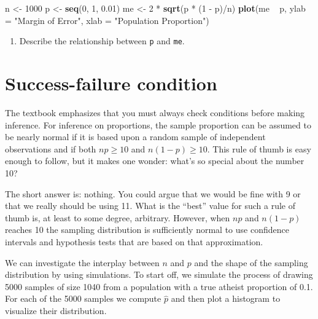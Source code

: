 \documentclass[]{book}
\newenvironment{Shaded}{\begin{snugshade}}{\end{snugshade}}
\newcommand{\KeywordTok}[1]{\textcolor[rgb]{0.13,0.29,0.53}{\textbf{{#1}}}}
\newcommand{\DataTypeTok}[1]{\textcolor[rgb]{0.13,0.29,0.53}{{#1}}}
\newcommand{\DecValTok}[1]{\textcolor[rgb]{0.00,0.00,0.81}{{#1}}}
\newcommand{\FloatTok}[1]{\textcolor[rgb]{0.00,0.00,0.81}{{#1}}}
\newcommand{\StringTok}[1]{\textcolor[rgb]{0.31,0.60,0.02}{{#1}}}
\newcommand{\NormalTok}[1]{{#1}}
\providecommand{\tightlist}{%
  \setlength{\itemsep}{0pt}\setlength{\parskip}{0pt}}
\theoremstyle{definition}
\theoremstyle{definition}
\theoremstyle{definition}
\theoremstyle{remark}
\begin{document}
\begin{Shaded}
\begin{Highlighting}[]
\NormalTok{n <-}\StringTok{ }\DecValTok{1000}
\NormalTok{p <-}\StringTok{ }\KeywordTok{seq}\NormalTok{(}\DecValTok{0}\NormalTok{, }\DecValTok{1}\NormalTok{, }\FloatTok{0.01}\NormalTok{)}
\NormalTok{me <-}\StringTok{ }\DecValTok{2} \NormalTok{*}\StringTok{ }\KeywordTok{sqrt}\NormalTok{(p *}\StringTok{ }\NormalTok{(}\DecValTok{1} \NormalTok{-}\StringTok{ }\NormalTok{p)/n)}
\KeywordTok{plot}\NormalTok{(me ~}\StringTok{ }\NormalTok{p, }\DataTypeTok{ylab =} \StringTok{"Margin of Error"}\NormalTok{, }\DataTypeTok{xlab =} \StringTok{"Population Proportion"}\NormalTok{)}
\end{Highlighting}
\end{Shaded}

\begin{enumerate}
\def\labelenumi{\arabic{enumi}.}
\setcounter{enumi}{7}
\tightlist
\item
  Describe the relationship between \texttt{p} and \texttt{me}.
\end{enumerate}

\section{Success-failure condition}\label{success-failure-condition}

The textbook emphasizes that you must always check conditions before
making inference. For inference on proportions, the sample proportion
can be assumed to be nearly normal if it is based upon a random sample
of independent observations and if both \(np \geq 10\) and
\(n(1 - p) \geq 10\). This rule of thumb is easy enough to follow, but
it makes one wonder: what's so special about the number 10?

The short answer is: nothing. You could argue that we would be fine with
9 or that we really should be using 11. What is the ``best'' value for
such a rule of thumb is, at least to some degree, arbitrary. However,
when \(np\) and \(n(1-p)\) reaches 10 the sampling distribution is
sufficiently normal to use confidence intervals and hypothesis tests
that are based on that approximation.

We can investigate the interplay between \(n\) and \(p\) and the shape
of the sampling distribution by using simulations. To start off, we
simulate the process of drawing 5000 samples of size 1040 from a
population with a true atheist proportion of 0.1. For each of the 5000
samples we compute \(\hat{p}\) and then plot a histogram to visualize
their distribution.
\end{document}
